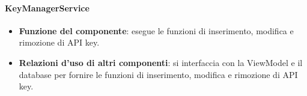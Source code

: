 \paragraph{KeyManagerService}
\begin{itemize}
	\item \textbf{Funzione del componente}: esegue le funzioni di inserimento, modifica e rimozione di API key.
\item \textbf{Relazioni d’uso di altri componenti}: si interfaccia con la ViewModel e il database per fornire le funzioni di inserimento, modifica e rimozione di API key.
\end{itemize}

